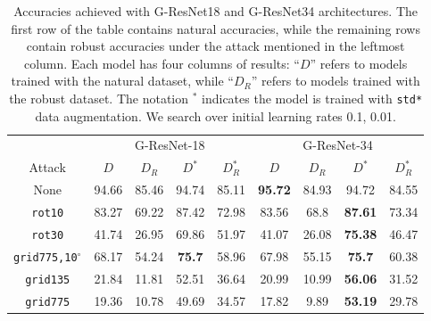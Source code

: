 \begin{table}[htb]
    \caption{Accuracies achieved with G-ResNet18 and G-ResNet34 architectures. The first row of the table contains natural accuracies, while the remaining rows contain robust accuracies under the attack mentioned in the leftmost column. Each model has four columns of results: ``$D$'' refers to models trained with the natural dataset, while ``$D_R$'' refers to models trained with the robust dataset. The notation $^*$ indicates the model is trained with \texttt{std*} data augmentation. We search over initial learning rates {0.1, 0.01}.} \label{tab:spatialattack_g_resnet}
    \begin{adjustwidth}{-.5in}{-.5in}  
        \vspace{15pt}
        \begin{center}
            \begin{tabular}{|c|cccc|cccc|}
                \hline
                & 
                \multicolumn{4}{c|}{G-ResNet-18} & \multicolumn{4}{c|}{G-ResNet-34} \\
                Attack & $D$ & $D_R$ & $D^*$ & $D_R^*$ & $D$ & $D_R$ & $D^*$ & $D_R^*$ \\ 
                \hline
                None &
                94.66 & 85.46 & 94.74 & 85.11 &  %
                \textbf{95.72} & 84.93 & 94.72 & 84.55   %
                \\
                \texttt{rot10} &
                83.27 & 69.22 & 87.42 & 72.98 &  %
                83.56 & 68.8 & \textbf{87.61} & 73.34   %
                \\
                \texttt{rot30} &
                41.74 & 26.95 & 69.86 & 51.97 &  %
                41.07 & 26.08 & \textbf{75.38} & 46.47   %
                \\
                \texttt{grid775,10$^\circ$} &
                68.17 & 54.24 & \textbf{75.7} &  %
                58.96 & 67.98 & 55.15 & \textbf{75.7} & 60.38   %
                \\
                \texttt{grid135} &
                21.84 & 11.81 & 52.51 & 36.64 &  %
                20.99 & 10.99 & \textbf{56.06} & 31.52   %
                \\
                \texttt{grid775} &
                19.36 & 10.78 & 49.69 & 34.57  %
                & 17.82 & 9.89 & \textbf{53.19} & 29.78   %
                \\
                \hline
            \end{tabular}
        \end{center}
    \end{adjustwidth}
\end{table}

